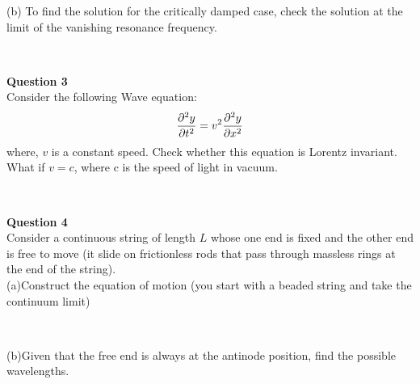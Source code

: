 \documentclass[addpoints]{exam}
\begin{document}
\begin{questions}
\begin{solution}
\end{solution}


(b) To find the solution for the critically damped case, check the solution at the limit of the 
vanishing resonance frequency.
\begin{solution}\\
 
\end{solution}

\question \textbf{ Question 3}\\
Consider the following Wave equation:
\begin{align*}
    \pdv[2]{y}{t} = v^2\pdv[2]{y}{x}
\end{align*}
where, $v$ is a constant speed. Check whether this equation is Lorentz invariant. What if
$v=c$, where c is the speed of light in vacuum.
\begin{solution}\\
 
\end{solution}

\question \textbf{ Question 4}\\
Consider a continuous string of length  $L$ whose one end is fixed and the other end is free to
move (it slide on frictionless rods that pass through massless rings at the end of the string).\\ 
(a)Construct the equation of motion (you start with a beaded string and take the continuum
limit)
\begin{solution}\\
 
\end{solution}

(b)Given that the free end is always at the antinode position, find the possible wavelengths.
\begin{solution}\\
 
\end{solution}

\end{questions}
\end{document}
